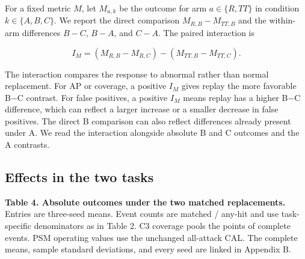 \documentclass[
  american,
]{article}
\begin{document}
For a fixed metric \(M\), let \(M_{a,k}\) be the outcome for arm
\(a\in\{R,TT\}\) in condition \(k\in\{A,B,C\}\). We report the direct
comparison \(M_{R,B}-M_{TT,B}\) and the within-arm differences \(B-C\),
\(B-A\), and \(C-A\). The paired interaction is

\[
I_M=(M_{R,B}-M_{R,C})-(M_{TT,B}-M_{TT,C}).
\]

The interaction compares the response to abnormal rather than normal
replacement. For AP or coverage, a positive \(I_M\) gives replay the
more favorable B−C contrast. For false positives, a positive \(I_M\)
means replay has a higher B−C difference, which can reflect a larger
increase or a smaller decrease in false positives. The direct B
comparison can also reflect differences already present under A. We read
the interaction alongside absolute B and C outcomes and the A contrasts.

\subsection{Effects in the two tasks}\label{effects-in-the-two-tasks}

\textbf{Table 4. Absolute outcomes under the two matched replacements.}
Entries are three-seed means. Event counts are matched / any-hit and use
task-specific denominators as in Table 2. C3 coverage pools the points
of complete events. PSM operating values use the unchanged all-attack
CAL. The complete means, sample standard deviations, and every seed are
linked in Appendix B.
\end{document}

